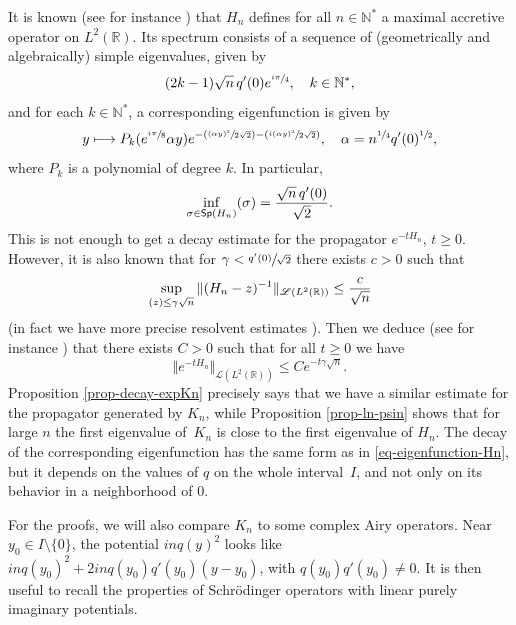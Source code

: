 \documentclass[11pt]{article}
\numberwithin{equation}{section}
\let\mathcal\mathscr
\def\mto{\mathchoice{\longmapsto}{\mapsto}{\mapsto}{\mapsto}}
\newcommand{\Psfrac}[2]{(\sfrac{#1}{#2})}
\theoremstyle{plain}
\theoremstyle{definition}
\newcommand{\nr}[1]{\Vert #1\Vert}
\newcommand{\set}[1]{\{ #1\}}
\newcommand{\inv}{^{-1}}
\newcommand{\1}{\mathds 1}
\let\Re\relax
\DeclareMathOperator{\Re}{\mathsf{Re}\mkern2mu}
\newcommand{\Sp}{\mathsf{Sp}}
\newcommand{\R}{\mathbb{R}}
\newcommand{\N}{\mathbb{N}}
\let\a\alpha
\let\g\gamma
\let\s\sigma
\newcommand{\Lc}{{\mathcal L}}
\begin{document}
It is known (see for instance \cite[\S 14.4]{helffer}) that $H_n$ defines for all $n \in \N^*$ a maximal accretive operator on $L^2(\R)$. Its spectrum consists of a sequence of (geometrically and algebraically) simple eigenvalues, given by
\[
(2k - 1) \sqrt n\, q'(0) e^{\sfrac {i\pi}4} , \quad k \in \N^*,
\]
and for each $k \in \N^*$, a corresponding eigenfunction is given by
\begin{equation} \label{eq-eigenfunction-Hn}
y \mto P_k(e^{\sfrac {i\pi}8} \a y) e^{- \Psfrac {(\a y)^2}{2\sqrt 2} - \Psfrac {i(\a y)^2}{2\sqrt 2}}, \quad \a = n^{\sfrac 14} q'(0)^{\sfrac 12},
\end{equation}
where $P_k$ is a polynomial of degree $k$. In particular,
\[
\inf_{\s \in \Sp(H_n)} \Re(\s) = \frac {\sqrt n\,q'(0)}{\sqrt 2}.
\]
This is not enough to get a decay estimate for the propagator $e^{-t H_n}$, $t \geq 0$. However, it is also known that for $\gamma < \sfrac {q'(0)}{\sqrt 2}$ there exists $c > 0$ such that
\begin{equation} \label{estim-Hn-resolvent}
\sup_{\Re(z) \leq \g \sqrt n} \nr{(H_n-z)\inv}_{\Lc(L^2(\R))} \leq \frac {c}{\sqrt n}
\end{equation}
(in fact we have more precise resolvent estimates \cite{HitrikSjoVio13,KrejcirikSieTatVio15}). Then we deduce (see for instance \cite[Th. V.1.11]{engel}) that there exists $C > 0$ such that for all $t \geq 0$ we have
\begin{equation} \label{estim-Hn-propagator}
\nr{e^{-tH_n}}_{\Lc(L^2(\R))} \leq C e^{-t\gamma \sqrt n}.
\end{equation}
Proposition \ref{prop-decay-expKn} precisely says that we have a similar estimate for the propagator generated by $K_n$, while Proposition \ref{prop-ln-psin} shows that for large $n$ the first eigenvalue of~$K_n$ is close to the first eigenvalue of $H_n$. The decay of the corresponding eigenfunction has the same form as in \eqref{eq-eigenfunction-Hn}, but it depends on the values of $q$ on the whole interval~$I$, and not only on its behavior in a neighborhood of 0.

For the proofs, we will also compare $K_n$ to some complex Airy operators. Near $y_0 \in I \setminus \set 0$, the potential $in q(y)^2$ looks like $inq(y_0)^2 + 2in q(y_0) q'(y_0) (y-y_0)$, with $q(y_0) q'(y_0) \neq 0$. It is then useful to recall the properties of Schrödinger operators with linear purely imaginary potentials.
\end{document}
